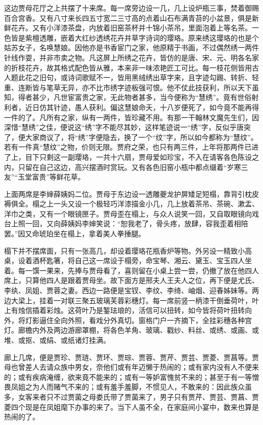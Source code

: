 这边贾母花厅之上共摆了十来席。每一席旁边设一几，几上设炉瓶三事，焚着御赐百合宫香。又有八寸来长四五寸宽二三寸高的点着山石布满青苔的小盆景，俱是新鲜花卉。又有小洋漆茶盘，内放着旧窑茶杯并十锦小茶吊，里面泡着上等名茶。一色皆是紫檀透雕，嵌着大红纱透绣花卉并草字诗词的璎珞。原来绣这璎珞的也是个姑苏女子，名唤慧娘。因他亦是书香宦门之家，他原精于书画，不过偶然绣一两件针线作耍，并非市卖之物。凡这屏上所绣之花卉，皆仿的是唐、宋、元、明各名家的折枝花卉，故其格式配色皆从雅，本来非一味浓艳匠工可比。每一枝花侧皆用古人题此花之旧句，或诗词歌赋不一，皆用黑绒绣出草字来，且字迹勾踢、转折、轻重、连断皆与笔草无异，亦不比市绣字迹板强可恨。他不仗此技获利，所以天下虽知，得者甚少，凡世宦富贵之家，无此物者甚多，当今便称为``慧绣''。竟有世俗射利者，近日仿其针迹，愚人获利。偏这慧娘命夭，十八岁便死了，如今竟不能再得一件的了。凡所有之家，纵有一两件，皆珍藏不用。有那一干翰林文魔先生们，因深惜``慧绣''之佳，便说这``绣''字不能尽其妙，这样笔迹说一``绣''字，反似乎唐突了，便大家商议了，将``绣''字便隐去，换了一个``纹''字，所以如今都称为``慧纹''。若有一件真``慧纹''之物，价则无限。贾府之荣，也只有两三件，上年将那两件已进了上，目下只剩这一副璎珞，一共十六扇，贾母爱如珍宝，不入在请客各色陈设之内，只留在自己这边，高兴摆酒时赏玩。又有各色旧窑小瓶中都点缀着``岁寒三友''``玉堂富贵''等鲜花草。

上面两席是李婶薛姨妈二位。贾母于东边设一透雕夔龙护屏矮足短榻，靠背引枕皮褥俱全。榻之上一头又设一个极轻巧洋漆描金小几，几上放着茶吊、茶碗、漱盂、洋巾之类，又有一个眼镜匣子。贾母歪在榻上，与众人说笑一回，又自取眼镜向戏台上照一回，又向薛姨妈李婶笑说：``恕我老了，骨头疼，放肆，容我歪着相陪罢。''因又命琥珀坐在榻上，拿着美人拳捶腿。

榻下并不摆席面，只有一张高几，却设着璎珞花瓶香炉等物。外另设一精致小高桌，设着酒杯匙箸，将自己这一席设于榻旁，命宝琴、湘云、黛玉、宝玉四人坐着。每一馔一果来，先捧与贾母看了，喜则留在小桌上尝一尝，仍撤了放在他四人席上，只算他四人是跟着贾母坐。故下面方是邢夫人王夫人之位，再下便是尤氏、李纨、凤姐、贾蓉之妻。西边一路便是宝钗、李纹、李绮、岫烟、迎春姊妹等。两边大梁上，挂着一对联三聚五玻璃芙蓉彩穗灯。每一席前竖一柄漆干倒垂荷叶，叶上有烛信插着彩烛。这荷叶乃是錾珐琅的，活信可以扭转，如今皆将荷叶扭转向外，将灯影逼住全向外照，看戏分外真切。窗格门户一齐摘下，全挂彩穗各种宫灯。廊檐内外及两边游廊罩棚，将各色羊角、玻璃、戳纱、料丝、或绣、或画、或堆、或抠、或绢、或纸诸灯挂满。

廊上几席，便是贾珍、贾琏、贾环、贾琮、贾蓉、贾芹、贾芸、贾菱、贾菖等。贾母也曾差人去请众族中男女，奈他们或有年迈懒于热闹的；或有家内没有人不便来的；或有疾病淹缠，欲来竟不能来的；或有一等妒富愧贫不来的；甚至于有一等憎畏凤姐之为人而赌气不来的；或有羞手羞脚，不惯见人，不敢来的：因此族众虽多，女客来者只不过贾菌之母娄氏带了贾菌来了，男子只有贾芹、贾芸、贾菖、贾菱四个现是在凤姐麾下办事的来了。当下人虽不全，在家庭间小宴中，数来也算是热闹的了。

